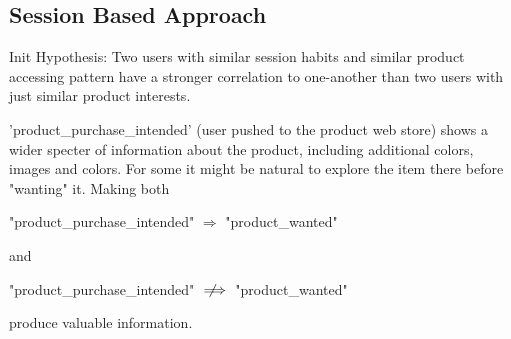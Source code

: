 







\subsection{Session Based Approach}
Init Hypothesis:
Two users with similar session habits and similar product accessing pattern
have a stronger correlation to one-another than two users with just similar
product interests.


'product\_purchase\_intended' (user pushed to the product web store) shows a
wider specter of information about the product, including additional colors,
images and colors.  For some it might be natural to explore the item there
before "wanting" it. Making both

"product\_purchase\_intended" $\Rightarrow$ "product\_wanted"

and

"product\_purchase\_intended" $\notimplies$ "product\_wanted"

produce valuable information.

